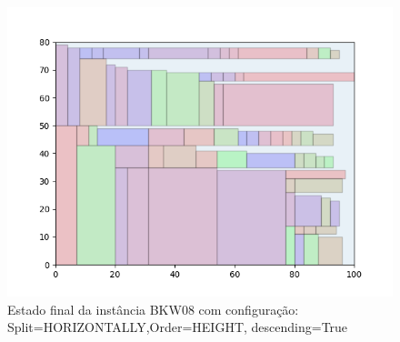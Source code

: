 \begin{figure}[H]
    \centering
    \caption[]{Estado final da instância BKW08 com configuração: Split=HORIZONTALLY,Order=HEIGHT, descending=True}
    \label{fig:bkw08-horizontally-height-true}
    \includegraphics[scale=0.5]{output/figures/bkw/bkw08/horizontally/height/true/00}
\end{figure}